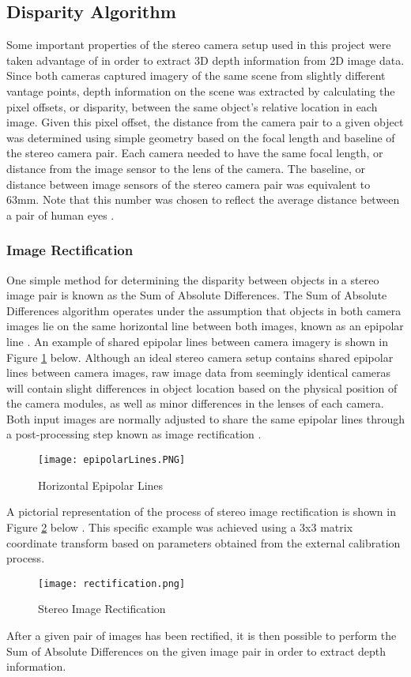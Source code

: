 \subsection{Disparity Algorithm}
Some important properties of the stereo camera setup used in this project were taken advantage of in order to extract 3D depth information from 2D image data. Since both cameras captured imagery of the same scene from slightly different vantage points, depth information on the scene was extracted by calculating the pixel offsets, or disparity, between the same object's relative location in each image. Given this pixel offset, the distance from the camera pair to a given object was determined using simple geometry based on the focal length and baseline of the stereo camera pair. Each camera needed to have the same focal length, or distance from the image sensor to the lens of the camera. The baseline, or distance between image sensors of the stereo camera pair was equivalent to 63mm. Note that this number was chosen to reflect the average distance between a pair of human eyes \cite{collins}. 
\subsubsection{Image Rectification} \label{rectsec}
One simple method for determining the disparity between objects in a stereo image pair is known as the Sum of Absolute Differences. The Sum of Absolute Differences algorithm operates under the assumption that objects in both camera images lie on the same horizontal line between both images, known as an epipolar line \cite{collins}. An example of shared epipolar lines between camera imagery is shown in Figure \ref{epipolarLines} below. Although an ideal stereo camera setup contains shared epipolar lines between camera images, raw image data from seemingly identical cameras will contain slight differences in object location based on the physical position of the camera modules, as well as minor differences in the lenses of each camera. Both input images are normally adjusted to share the same epipolar lines through a post-processing step known as image rectification \cite{collins}. 
\par
\begin{figure}[H]
	\centerline{\texttt{[image: epipolarLines.PNG]}}
	\caption{Horizontal Epipolar Lines \cite{collins}}
	\label{epipolarLines}
\end{figure}
\par
A pictorial representation of the process of stereo image rectification is shown in Figure \ref{rectification} below \cite{mattoccia_slides}. This specific example was achieved using a 3x3 matrix coordinate transform based on parameters obtained from the external calibration process. 
\begin{figure}[H]
	\centerline{\texttt{[image: rectification.png]}}
	\caption{Stereo Image Rectification \cite{mattoccia_slides}}
	\label{rectification}
\end{figure}
\par
After a given pair of images has been rectified, it is then possible to perform the Sum of Absolute Differences on the given image pair in order to extract depth information. 
